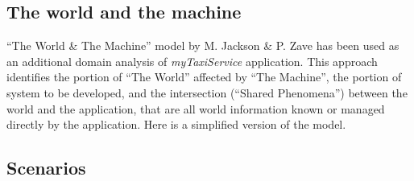 \documentclass[a4paper,11pt]{report} %
\newcommand{\mts}{\mbox{\normalfont\itshape myTaxiService}}
\begin{document}
	\subsection{The world and the machine} ``The World \& The Machine''	model by M. Jackson \& P. Zave has been used as an additional domain analysis of \mts{} application. This approach identifies the portion of ``The World'' affected by ``The Machine'', the portion of system to be developed, and the intersection (``Shared Phenomena'') between the world and the application, that are all world information known or managed directly by the application. Here is a simplified version of the model.
	
		\noindent%
		\begin{minipage}{\linewidth}
		\end{minipage}	
	
	\subsection{Scenarios}
	
\end{document}
